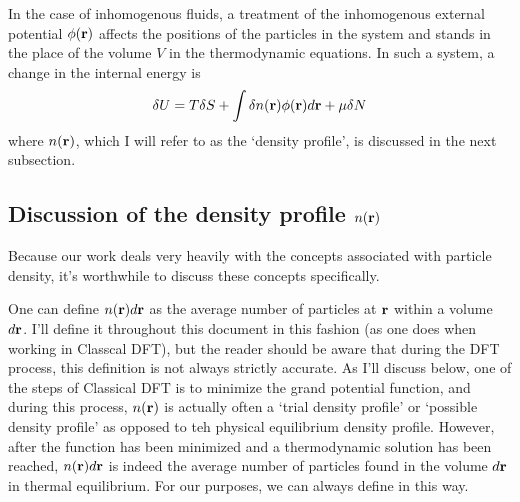 In the case of inhomogenous fluids, a treatment of the inhomogenous
external potential $\phi(\textbf{r})$ affects the positions of the
particles in the system and stands in the place of the volume $V$ in
the thermodynamic equations.  In such a system, a change in the
internal energy is
\begin{align}
  \delta U = T\delta S + \int \delta n(\textbf{r})\phi(\textbf{r})d\textbf{r} + \mu \delta N
\end{align}
where $n(\textbf{r})$, which I will refer to as the `density profile',
is discussed in the next subsection.

\subsection{Discussion of the density profile $n(\textbf{r})$}
Because our work deals very heavily with the concepts associated with
particle density, it's worthwhile to discuss these concepts
specifically.

One can define $n(\textbf{r})d\textbf{r}$ as the average number of particles at
$\textbf{r}$ within a volume $d\textbf{r}$.  I'll define it throughout this document
in this fashion (as one does when working in Classcal DFT), but the
reader should be aware that during the DFT process, this definition is
not always strictly accurate.  As I'll discuss below, one of the steps
of Classical DFT is to minimize the grand potential function, and
during this process, $n(\textbf{r})$ is actually often a `trial density
profile' or `possible density profile' as opposed to teh physical
equilibrium density profile.  However, after the function has been
minimized and a thermodynamic solution has been reached, $n(\textbf{r})d\textbf{r}$
is indeed the average number of particles found in the volume $d\textbf{r}$
in thermal equilibrium.  For our purposes, we can always define in
this way.

